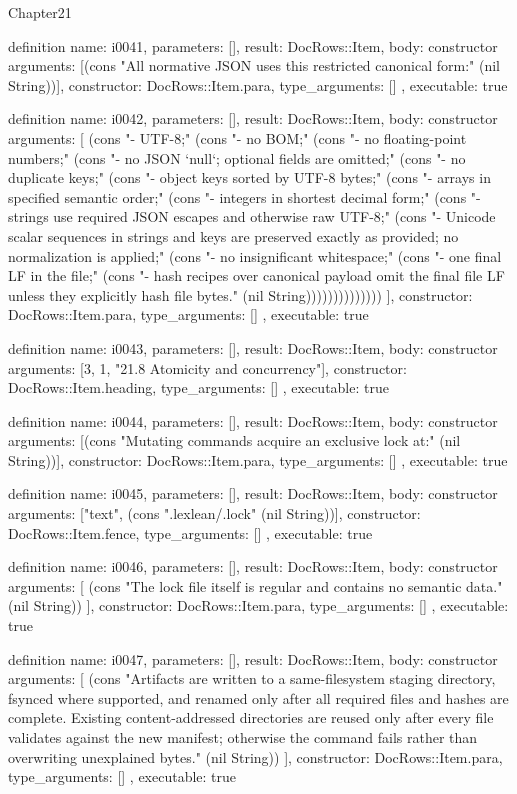\begin{lexlean}{Chapter21}
\begin{semanticmodule}
definition{
  name: i0041,
  parameters: [],
  result: DocRows::Item,
  body: constructor{
    arguments: [(cons "All normative JSON uses this restricted canonical form:" (nil String))],
    constructor: DocRows::Item.para,
    type_arguments: []
  },
  executable: true
}

definition{
  name: i0042,
  parameters: [],
  result: DocRows::Item,
  body: constructor{
    arguments: [
      (cons "- UTF-8;" (cons "- no BOM;" (cons "- no floating-point numbers;" (cons "- no JSON `null`; optional fields are omitted;" (cons "- no duplicate keys;" (cons "- object keys sorted by UTF-8 bytes;" (cons "- arrays in specified semantic order;" (cons "- integers in shortest decimal form;" (cons "- strings use required JSON escapes and otherwise raw UTF-8;" (cons "- Unicode scalar sequences in strings and keys are preserved exactly as provided; no normalization is applied;" (cons "- no insignificant whitespace;" (cons "- one final LF in the file;" (cons "- hash recipes over canonical payload omit the final file LF unless they explicitly hash file bytes." (nil String))))))))))))))
    ],
    constructor: DocRows::Item.para,
    type_arguments: []
  },
  executable: true
}

definition{
  name: i0043,
  parameters: [],
  result: DocRows::Item,
  body: constructor{
    arguments: [3, 1, "21.8 Atomicity and concurrency"],
    constructor: DocRows::Item.heading,
    type_arguments: []
  },
  executable: true
}

definition{
  name: i0044,
  parameters: [],
  result: DocRows::Item,
  body: constructor{
    arguments: [(cons "Mutating commands acquire an exclusive lock at:" (nil String))],
    constructor: DocRows::Item.para,
    type_arguments: []
  },
  executable: true
}

definition{
  name: i0045,
  parameters: [],
  result: DocRows::Item,
  body: constructor{
    arguments: ["text", (cons ".lexlean/.lock" (nil String))],
    constructor: DocRows::Item.fence,
    type_arguments: []
  },
  executable: true
}

definition{
  name: i0046,
  parameters: [],
  result: DocRows::Item,
  body: constructor{
    arguments: [
      (cons "The lock file itself is regular and contains no semantic data." (nil String))
    ],
    constructor: DocRows::Item.para,
    type_arguments: []
  },
  executable: true
}

definition{
  name: i0047,
  parameters: [],
  result: DocRows::Item,
  body: constructor{
    arguments: [
      (cons "Artifacts are written to a same-filesystem staging directory, fsynced where supported, and renamed only after all required files and hashes are complete. Existing content-addressed directories are reused only after every file validates against the new manifest; otherwise the command fails rather than overwriting unexplained bytes." (nil String))
    ],
    constructor: DocRows::Item.para,
    type_arguments: []
  },
  executable: true
}


\end{semanticmodule}
\end{lexlean}
